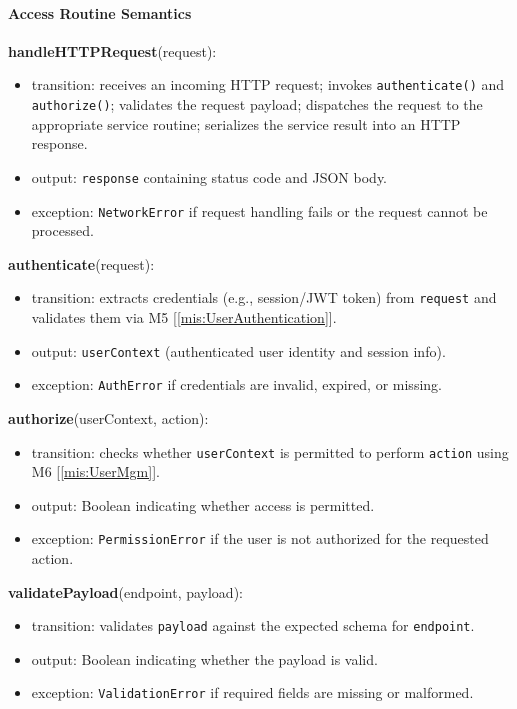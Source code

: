 \documentclass[12pt, titlepage]{article}
\begin{document}
  \paragraph{Access Routine Semantics}

  \noindent \textbf{handleHTTPRequest}(request):
  \begin{itemize}
    \item transition: receives an incoming HTTP request; invokes \texttt{authenticate()} and \texttt{authorize()}; validates the request payload; dispatches the request to the appropriate service routine; serializes the service result into an HTTP response.
    \item output: \texttt{response} containing status code and JSON body.
    \item exception: \texttt{NetworkError} if request handling fails or the request cannot be processed.
  \end{itemize}

  \noindent \textbf{authenticate}(request):
  \begin{itemize}
    \item transition: extracts credentials (e.g., session/JWT token) from \texttt{request} and validates them via M5 [\ref{mis:UserAuthentication}].
    \item output: \texttt{userContext} (authenticated user identity and session info).
    \item exception: \texttt{AuthError} if credentials are invalid, expired, or missing.
  \end{itemize}

  \noindent \textbf{authorize}(userContext, action):
  \begin{itemize}
    \item transition: checks whether \texttt{userContext} is permitted to perform \texttt{action} using M6 [\ref{mis:UserMgm}].
    \item output: Boolean indicating whether access is permitted.
    \item exception: \texttt{PermissionError} if the user is not authorized for the requested action.
  \end{itemize}

  \noindent \textbf{validatePayload}(endpoint, payload):
  \begin{itemize}
    \item transition: validates \texttt{payload} against the expected schema for \texttt{endpoint}.
    \item output: Boolean indicating whether the payload is valid.
    \item exception: \texttt{ValidationError} if required fields are missing or malformed.
  \end{itemize}
\end{document}
